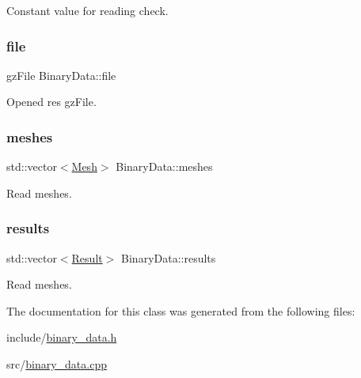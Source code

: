 Constant value for reading check. 

\mbox{\label{classBinaryData_a9eae74bdf3b91a3e1461802d820591e3}} 
\subsubsection{\texorpdfstring{file}{file}}
{\footnotesize\ttfamily gz\+File Binary\+Data\+::file\hspace{0.3cm}{\ttfamily [protected]}}



Opened res gz\+File. 

\mbox{\label{classBinaryData_af5e37d66b40c5cc7d835bac81a165b14}} 
\subsubsection{\texorpdfstring{meshes}{meshes}}
{\footnotesize\ttfamily std\+::vector$<$\hyperlink{classMesh}{Mesh}$>$ Binary\+Data\+::meshes\hspace{0.3cm}{\ttfamily [protected]}}



Read meshes. 

\mbox{\label{classBinaryData_a81c3bb02cb37946f441ce336bdf43784}} 
\subsubsection{\texorpdfstring{results}{results}}
{\footnotesize\ttfamily std\+::vector$<$\hyperlink{classResult}{Result}$>$ Binary\+Data\+::results\hspace{0.3cm}{\ttfamily [protected]}}



Read meshes. 



The documentation for this class was generated from the following files\+:\begin{DoxyCompactItemize}
\item 
include/\hyperlink{binary__data_8h}{binary\+\_\+data.\+h}\item 
src/\hyperlink{binary__data_8cpp}{binary\+\_\+data.\+cpp}\end{DoxyCompactItemize}
